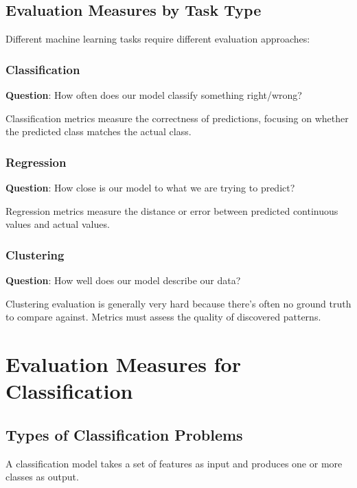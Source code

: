 \documentclass[11pt,a4paper]{article}
\theoremstyle{definition}
\theoremstyle{plain}
\theoremstyle{remark}
\begin{document}
\subsection{Evaluation Measures by Task Type}

Different machine learning tasks require different evaluation approaches:

\subsubsection{Classification}

\textbf{Question}: How often does our model classify something right/wrong?

Classification metrics measure the correctness of predictions, focusing on whether the predicted class matches the actual class.

\subsubsection{Regression}

\textbf{Question}: How close is our model to what we are trying to predict?

Regression metrics measure the distance or error between predicted continuous values and actual values.

\subsubsection{Clustering}

\textbf{Question}: How well does our model describe our data?

Clustering evaluation is generally very hard because there's often no ground truth to compare against. Metrics must assess the quality of discovered patterns.

\section{Evaluation Measures for Classification}

\subsection{Types of Classification Problems}

A classification model takes a set of features as input and produces one or more classes as output.
\end{document}
